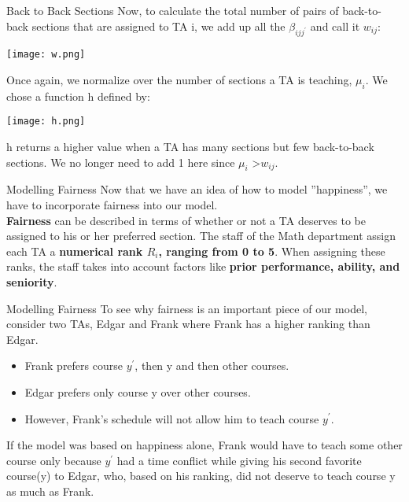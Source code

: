 \documentclass[9pt]{beamer}
\begin{document}
\begin{frame}{Back to Back Sections}
Now, to calculate the total number of pairs of back-to-back sections that are assigned to TA i, we add up all the $ \beta_{ijj^'} $ and call it $ w_{ij} $:
\begin{center}
    \texttt{[image: w.png]}\\
\end{center}
\pause
Once again, we normalize over the number of sections a TA is teaching, $ \mu_i $. We chose a function h defined by:
\begin{center}
    \texttt{[image: h.png]}\\
\end{center}
h returns a higher value when a TA has many sections but few back-to-back sections. We no longer need to add 1 here since $ \mu_i $ \textgreater $ w_{ij} $. 
\end{frame} 

\begin{frame}{Modelling Fairness}
Now that we have an idea of how to model ”happiness”, we have to incorporate fairness into our model.\\
\vspace{0.3cm}
\pause
\textbf{Fairness} can be described in terms of whether or not a TA deserves to be assigned to his or her preferred section. The staff of the Math department assign each TA a \textbf{numerical rank $ R_i $, ranging from 0 to 5}. When assigning these ranks, the staff takes into account factors like \textbf{prior performance, ability, and seniority}.\\
\end{frame}

\begin{frame}{Modelling Fairness}
To see why fairness is an important piece of our model, consider two TAs, Edgar and Frank where Frank has a higher ranking than Edgar.\\
\pause
\begin{itemize}
    \item Frank prefers course $ y^' $, then y and then other courses.
    \item Edgar prefers only course y over other courses.
    \item However, Frank’s schedule will not allow him to teach course $ y^' $. 
\end{itemize}
\pause
If the model was based on happiness alone, Frank would have to teach some other course only because $ y^' $ had a time conflict while giving his second favorite course(y) to Edgar, who, based on his ranking, did not deserve to teach course y as much as Frank. 
\end{frame} 
\end{document}
